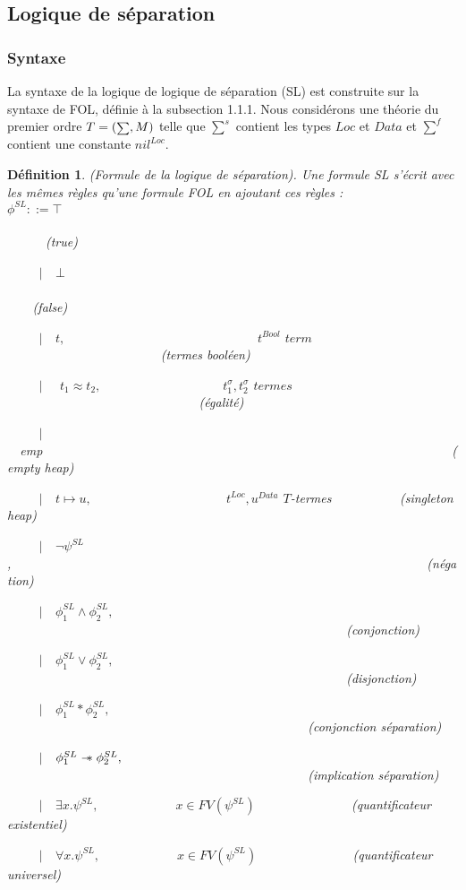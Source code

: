 \documentclass[11pt,openany]{article}
\newcommand\sepimp{\mathrel{-\mkern-6mu*}}
\newtheorem{definition}{D\'efinition}[subsection]
\begin{document}
	\subsection{Logique de s\'eparation}
		\subsubsection{Syntaxe}
	La syntaxe de la logique de logique de s\'eparation (SL)\cite{OHearnRY01} est construite sur la syntaxe de FOL, d\'efinie \`a la subsection 1.1.1. Nous consid\'erons une th\'eorie du premier ordre $T=(\mathsmaller\sum,M)$ telle que $\sum^{s}$ contient les types $Loc$ et $Data$ et $\sum^{f}$ contient une constante $nil^{Loc}$.
	\begin{definition}
	(Formule de la logique de s\'eparation). Une formule SL s'\'ecrit avec les m\^emes r\`egles qu'une formule FOL en ajoutant ces r\`egles :
	\\$\phi^{SL} ::= \top$~~~~~~~~~~~~~~~~~~~~~~~~~~~~~~~~~~~~~~~~~~~~~~~~~~~~~~~~~~~~~~~~~~~~~~~~~~~~(true)\par
~~~~~$|$~~$\bot$~~~~~~~~~~~~~~~~~~~~~~~~~~~~~~~~~~~~~~~~~~~~~~~~~~~~~~~~~~~~~~~~~~~~~~~~~~(false)
\par
~~~~~$|$~~$t,$~~~~~~~~~~~~~~~~~~~~~~~~~~~~~~$t^{Bool}$ $term$~~~~~~~~~~~~~~~~~~~~~~~~(termes bool\'een)\par
~~~~~$|$~~ $t_{1} \approx t_{2},$~~~~~~~~~~~~~~~~~~~$t_{1}^{\sigma},t_{2}^{\sigma}$ $termes$~~~~~~~~~~~~~~~~~~~~~~~~~~~~~~(\'egalit\'e)\par
~~~~~$|$~~emp~~~~~~~~~~~~~~~~~~~~~~~~~~~~~~~~~~~~~~~~~~~~~~~~~~~~~~~~~~~~~~~~(empty heap)\par
~~~~~$|$~~$t\mapsto u,$~~~~~~~~~~~~~~~~~~~~~$t^{Loc},u^{Data}$ $T$-termes ~~~~~~~~~~(singleton heap)\par 
~~~~~$|$~~$\neg\psi^{SL}$,~~~~~~~~~~~~~~~~~~~~~~~~~~~~~~~~~~~~~~~~~~~~~~~~~~~~~~~~~~~~~~~~~(n\'egation)\par
~~~~~$|$~~$\phi_{1}^{SL} \land \phi_{2}^{SL},$~~~~~~~~~~~~~~~~~~~~~~~~~~~~~~~~~~~~~~~~~~~~~~~~~~~~~(conjonction)\par
~~~~~$|$~~$\phi_{1}^{SL} \lor \phi_{2}^{SL},$~~~~~~~~~~~~~~~~~~~~~~~~~~~~~~~~~~~~~~~~~~~~~~~~~~~~~(disjonction)\par
~~~~~$|$~~$\phi_{1}^{SL} * \phi_{2}^{SL},$~~~~~~~~~~~~~~~~~~~~~~~~~~~~~~~~~~~~~~~~~~~~~~~(conjonction s\'eparation)\par
~~~~~$|$~~$\phi_{1}^{SL} \sepimp \phi_{2}^{SL},$~~~~~~~~~~~~~~~~~~~~~~~~~~~~~~~~~~~~~~~~~~~~~~~(implication s\'eparation)\par
~~~~~$|$~~$\exists x.\psi^{SL},$~~~~~~~~~~~~$x\in FV(\psi^{SL})$~~~~~~~~~~~~~~~(quantificateur existentiel)\par
~~~~~$|$~~$\forall x.\psi^{SL},$~~~~~~~~~~~~$x\in FV(\psi^{SL})$~~~~~~~~~~~~~~~(quantificateur universel)
	\end{definition}
\end{document}
